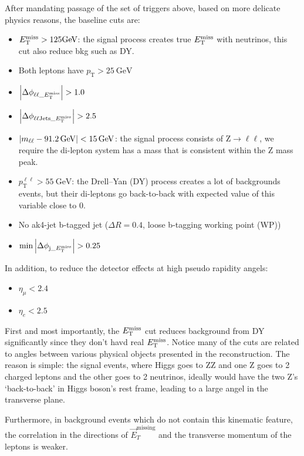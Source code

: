 After mandating passage of the set of triggers above, based on more delicate physics reasons, 
the baseline cuts are:
\begin{itemize}
    \item $E_{\mathrm{T}}^{\mathrm{miss}} > 125 \si{\giga\electronvolt}$:
        the signal process creates true $E_{\mathrm{T}}^{\mathrm{miss}}$ with neutrinos, this cut also reduce bkg such
        as DY.
    \item Both leptons have $p_\mathrm{T} > \SI{25}{\giga\electronvolt}$
    \item $\abs{\Delta\phi_{\ell\ell\_E_{\mathrm{T}}^{\mathrm{miss}}}} > 1.0$
    \item $\abs{\Delta\phi_{\ell\ell\mathrm{Jets}\_E_{\mathrm{T}}^{\mathrm{miss}}}} > 2.5$
    \item $\abs{m_{\ell\ell} - \SI{91.2}{\giga\electronvolt}} < \SI{15}{\giga\electronvolt}$:
        the signal process consists of $\mathrm{Z}\rightarrow{}\ell\ell$, we
        require the di-lepton system has a mass that is consistent within the Z mass peak.
    \item $p_\mathrm{T}^{\ell\ell} > \SI{55}{\giga\electronvolt} $: 
        the Drell–Yan (DY) process creates a lot of backgrounds events, but their di-leptons
        go back-to-back with expected value of this variable close to 0.
    \item No ak4-jet b-tagged jet ($\Delta{}R=0.4$, loose b-tagging working point (WP))
    \item $\min{\abs{ \Delta\phi_{\mathrm{j}\_E_{\mathrm{T}}^{\mathrm{miss}}}}} > 0.25$
\end{itemize}
In addition, to reduce the detector effects at high pseudo rapidity angels:
\begin{itemize}
    \item $\eta_\mu< 2.4$
    \item $\eta_e< 2.5$
\end{itemize}

First and most importantly, the $E_{\mathrm{T}}^{\mathrm{miss}}$ cut reduces background from DY significantly since they don't havd
real $E_{\mathrm{T}}^{\mathrm{miss}}$.  Notice many of the 
cuts are related to angles between various physical objects presented in the
reconstruction. The reason is simple: the signal events, where Higgs goes to ZZ and one Z
goes to 2 charged leptons and the other goes to 2 neutrinos, ideally would have the two Z's 
`back-to-back' in Higgs boson's rest frame, leading to a large angel in the transverse plane.

Furthermore, in background events which do not contain this kinematic feature, the
correlation in the directions of $\vec{E}_{T}^\mathrm{missing}$ and the transverse momentum of the leptons is weaker.


